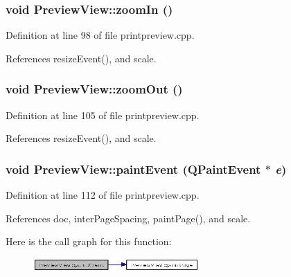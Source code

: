 \subsubsection{\setlength{\rightskip}{0pt plus 5cm}void Preview\-View::zoom\-In ()\hspace{0.3cm}{\tt  [slot]}}\label{classPreviewView_2eb6beb0f6138eb7612ddebf98574be3}




Definition at line 98 of file printpreview.cpp.

References resize\-Event(), and scale.
\subsubsection{\setlength{\rightskip}{0pt plus 5cm}void Preview\-View::zoom\-Out ()\hspace{0.3cm}{\tt  [slot]}}\label{classPreviewView_0d17404752b71ba4b111bc7cc9a7a158}




Definition at line 105 of file printpreview.cpp.

References resize\-Event(), and scale.
\subsubsection{\setlength{\rightskip}{0pt plus 5cm}void Preview\-View::paint\-Event (QPaint\-Event $\ast$ {\em e})\hspace{0.3cm}{\tt  [protected, virtual]}}\label{classPreviewView_ddc37a5b6ecc8dcbd61f2f1f064585e8}




Definition at line 112 of file printpreview.cpp.

References doc, inter\-Page\-Spacing, paint\-Page(), and scale.

Here is the call graph for this function:\begin{figure}[H]
\begin{center}
\leavevmode
\includegraphics[width=179pt]{classPreviewView_ddc37a5b6ecc8dcbd61f2f1f064585e8_cgraph}
\end{center}
\end{figure}

